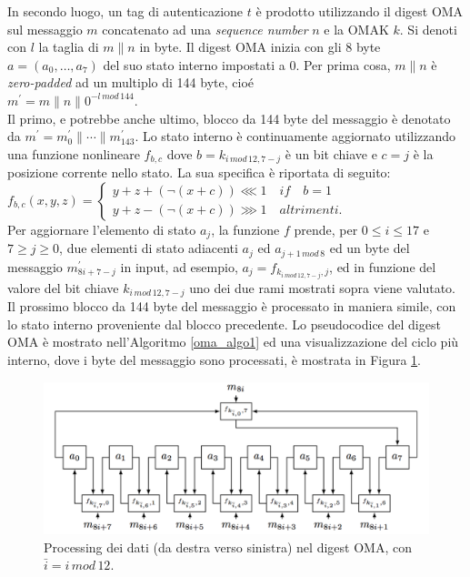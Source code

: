 In secondo luogo, un tag di autenticazione $t$ è prodotto utilizzando il digest OMA sul messaggio $m$ concatenato ad una \emph{sequence number} $n$ e la OMAK $k$. Si denoti con $l$ la taglia di $m\|n$ in byte. Il digest OMA inizia con gli 8 byte $a = (a_0, \ldots, a_7)$ del suo stato interno impostati a 0. Per prima cosa, $m\|n$ è \emph{zero-padded} ad un multiplo di 144 byte, cioé\\
\indent $m^\prime = m \| n \| 0^{-l\, mod\, 144}$.\\
Il primo, e potrebbe anche ultimo, blocco da 144 byte del messaggio è denotato da $m^\prime = m^\prime_0 \| \cdots \| m^\prime_{143}$. Lo stato interno è continuamente aggiornato utilizzando una funzione nonlineare $f_{b,c}$ dove $b = k_{i\, mod\, 12, 7-j}$ è un bit chiave e $c = j$ è la posizione corrente nello stato. La sua specifica è riportata di seguito:\\
\indent   $f_{b,c}(x,y,z)=
\begin{cases}
	y + z + (\neg(x + c)) \lll 1\quad if\quad b=1\\
	y + z - (\neg(x + c)) \ggg 1\quad altrimenti.
\end{cases}$\\
Per aggiornare l'elemento di stato $a_j$, la funzione $f$ prende, per $0 \leq i \leq 17$ e $7 \geq j \geq 0$, due elementi di stato adiacenti $a_j$ ed $a_{j+1\, mod\, 8}$ ed un byte del messaggio $m^\prime_{8i+7-j}$ in input, ad esempio, $a_j = f_{k_{i\,mod\,12,7-j},j}$, ed in funzione del valore del bit chiave $k_{i\,mod\,12,7-j}$ uno dei due rami mostrati sopra viene valutato. Il prossimo blocco da 144 byte del messaggio è processato in maniera simile, con lo stato interno proveniente dal blocco precedente. Lo pseudocodice del digest OMA è mostrato nell'Algoritmo \ref{oma_algo1} ed una visualizzazione del ciclo più interno, dove i byte del messaggio sono processati, è mostrata in Figura \ref{inneroma_img}.
\begin{figure}[hbtp]
	\centering
	\includegraphics[scale=.3]{imgs/attack/oma_innerloop.png}
	\caption{Processing dei dati (da destra verso sinistra) nel digest OMA, con $\bar i = i\,mod\,12$.}
	\label{inneroma_img}
\end{figure}
